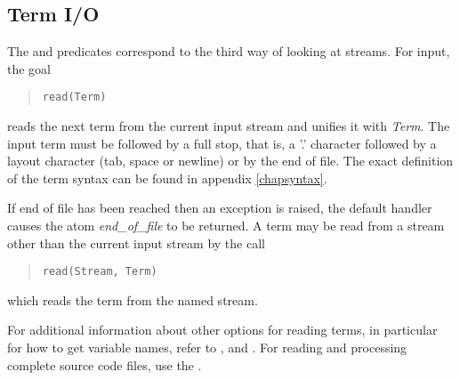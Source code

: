\subsection{Term I/O}
The  and  predicates  correspond to
the third way of looking at streams.
For input, the goal \begin{quote}\begin{verbatim}
read(Term)\end{verbatim}\end{quote} reads the next {\eclipse} term from the current input
stream and unifies it with {\it Term}. The input term must be followed by a
full stop, that is, a '.' character followed by a layout
character (tab, space or newline) or by the end of file.
The exact definition of the term syntax can be found in appendix
\ref{chapsyntax}.

If end of file has been reached then
an exception is raised, the default handler causes the atom
{\it end_of_file} to be returned.
A term may be read from a stream other than the current input stream by
the call \begin{quote}\begin{verbatim}
read(Stream, Term)\end{verbatim}\end{quote} which reads the term from the
named stream.

For additional information about other options for reading terms,
in particular for how to get variable names, refer to
,
 and
.
For reading and processing complete {\eclipse} source code files, use the
.



